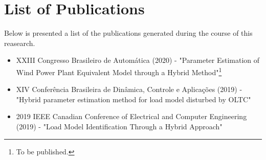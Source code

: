 \chapter*{List of Publications}
\label{ch: Publications}

Below is presented a list of the publications generated during the course of this reasearch.

\begin{itemize}
	\item XXIII Congresso Brasileiro de Autom\'atica (2020) - "Parameter Estimation of Wind Power Plant Equivalent Model through a Hybrid Method"\footnote{To be published.}
	\item XIV Conferência Brasileira de Dinâmica, Controle e Aplicações (2019) - "Hybrid parameter estimation method for load model disturbed by OLTC"
	\item 2019 IEEE Canadian Conference of Electrical and Computer Engineering (2019) - "Load Model Identification Through a Hybrid Approach"
\end{itemize}